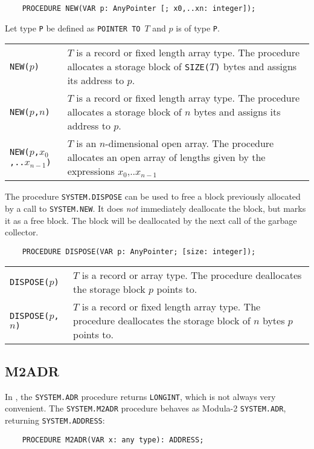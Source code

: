 \verb'    PROCEDURE NEW(VAR p: AnyPointer [; x0,..xn: integer]);'

Let type \verb|P| be defined as \mbox{{\tt POINTER TO} $T$} and
$p$ is of type \verb'P'.
\begin{center}
\begin{tabular}{lp{9cm}}
\tt NEW($p$)       &  $T$ is a record or fixed length array type.
                  The procedure allocates a storage block
                  of {\tt SIZE($T$)} bytes
                  and assigns its address to $p$.          \\

\tt NEW($p$,$n$)   &  $T$ is a record or fixed length array type.
                  The procedure allocates a storage block of $n$ bytes
                  and assigns its address to $p$.           \\
\tt NEW($p$,$x_0$,..$x_{n-1}$) & $T$ is an $n$-dimensional open array.
                The procedure allocates an open array of lengths
                given by the expressions $x_0$,..$x_{n-1}$     \\
\end{tabular}
\end{center}

The procedure {\tt SYSTEM.DISPOSE} can be used to free a block
previously allocated by a call to {\tt SYSTEM.NEW}.
It does {\em not} immediately deallocate the block, but marks it as a free
block. The block will be deallocated by the next call of the garbage
collector.

\verb'    PROCEDURE DISPOSE(VAR p: AnyPointer; [size: integer]);'

\begin{center}
\begin{tabular}{lp{9cm}}
\tt DISPOSE($p$)     & $T$ is a record or array type.
                       The procedure deallocates the storage block $p$ points to.   \\
\tt DISPOSE($p$,$n$) & $T$ is a record or fixed length array type.
                       The procedure deallocates the storage block of $n$ bytes $p$ points to. \\
\end{tabular}
\end{center}

\subsection{M2ADR}\label{o2:system:m2adr}

In \ot{}, the \verb'SYSTEM.ADR' procedure returns \verb'LONGINT',   %
which is not always very convenient. The {\tt SYSTEM.M2ADR}
procedure behaves as Modula-2 {\tt SYSTEM.ADR},   %
returning {\tt SYSTEM.ADDRESS}:

\verb'    PROCEDURE M2ADR(VAR x: any type): ADDRESS;'



